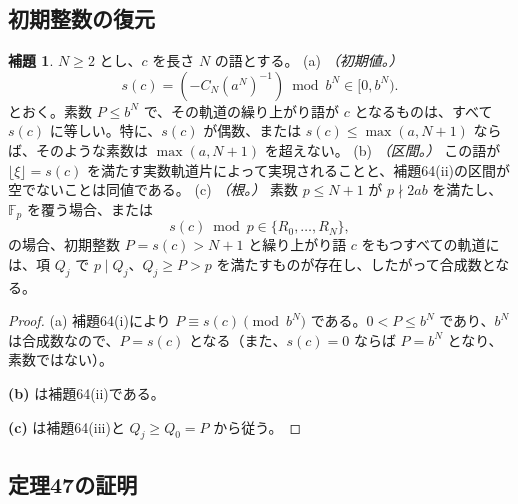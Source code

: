 \documentclass[11pt,reqno]{amsart}
\theoremstyle{definition}
\newtheorem{lemma}[theorem]{補題}
\theoremstyle{definition}
\theoremstyle{remark}
\begin{document}
\subsection{初期整数の復元}\label{sec:D.3}

\begin{samepage}
\begin{lemma}\leavevmode\label{thm:66}
\(N\ge2\) とし、\(c\) を長さ \(N\) の語とする。
(a) \emph{（初期値。）}
\[
s(c)=(-C_N(a^N)^{-1})\bmod b^N\in[0,b^N).
\]
とおく。素数 \(P\le b^N\) で、その軌道の繰り上がり語が \(c\) となるものは、すべて \(s(c)\) に等しい。特に、\(s(c)\) が偶数、または \(s(c)\le\max(a,N+1)\) ならば、そのような素数は \(\max(a,N+1)\) を超えない。
(b) \emph{（区間。）} この語が \(\lfloor\xi\rfloor=s(c)\) を満たす実数軌道片によって実現されることと、補題64(ii)の区間が空でないことは同値である。
(c) \emph{（根。）} 素数 \(p\le N+1\) が \(p\nmid2ab\) を満たし、\(\mathbb F_p\) を覆う場合、または
\[
s(c)\bmod p\in\{R_0,\ldots,R_N\},
\]
の場合、初期整数 \(P=s(c)>N+1\) と繰り上がり語 \(c\) をもつすべての軌道には、項 \(Q_j\) で \(p\mid Q_j\)、\(Q_j\ge P>p\) を満たすものが存在し、したがって合成数となる。
\label{thm-end:66}
\end{lemma}
\end{samepage}

\begin{proof}\leavevmode\label{proof:66}
(a) 補題64(i)により \(P\equiv s(c)\pmod{b^N}\) である。\(0<P\le b^N\) であり、\(b^N\) は合成数なので、\(P=s(c)\) となる（また、\(s(c)=0\) ならば \(P=b^N\) となり、素数ではない）。

\textbf{(b)} は補題64(ii)である。

\textbf{(c)} は補題64(iii)と \(Q_j\ge Q_0=P\) から従う。\qedhere
\end{proof}

\subsection{定理47の証明}\label{sec:D.4}
\end{document}
